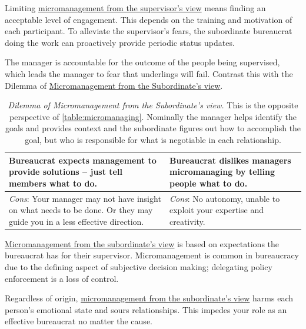 Limiting \hyperref[table:micromanaging]{micromanagement from the supervisor's view} means finding an acceptable level of engagement. This depends on the training and motivation of each participant. To alleviate the supervisor's fears, the subordinate bureaucrat doing the work can proactively provide periodic status updates. 

The manager is accountable for the outcome of the people being supervised, which leads the manager to fear that underlings will fail.  Contrast this with the Dilemma of  \hyperref[table:solution-provider]{Micromanagement from the Subordinate’s view}.

\begin{center}
\begin{table}[H] %
\begin{tabular}{ | m{\dilemmatablewidth}| m{\dilemmatablewidth} | } 
  \hline
  \textbf{Bureaucrat expects management to provide solutions -- just tell members what to do.} & 
  \textbf{Bureaucrat dislikes managers micromanaging by telling people what to do.} \\ 
  \hline
  \textit{Cons}: Your manager may not have insight on what needs to be done. Or they may guide you in a less effective direction. &
  \textit{Cons}: No autonomy, unable to exploit your expertise and creativity. \\  
  \hline
\end{tabular}
\caption{\textit{Dilemma of Micromanagement from the Subordinate's view.}
This is the opposite perspective of \ref{table:micromanaging}. Nominally the manager helps identify the goals and provides context and the subordinate figures out how to accomplish the goal, but who is responsible for what is negotiable in each relationship.
}
\label{table:solution-provider}
\end{table}
\end{center}

\hyperref[table:solution-provider]{Micromanagement from the subordinate's view} is based on expectations the bureaucrat has for their supervisor. Micromanagement is common in bureaucracy due to the defining aspect of subjective decision making; delegating policy enforcement is a loss of control. 

Regardless of origin, \hyperref[table:solution-provider]{micromanagement from the subordinate's view} harms each person's emotional state and sours relationships. This impedes your role as an effective bureaucrat no matter the cause.

